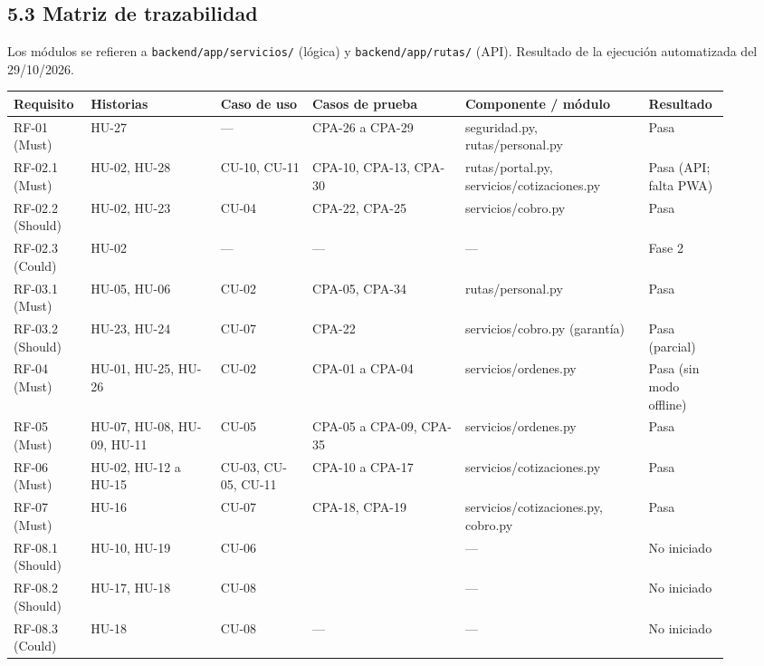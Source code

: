 \subsection{5.3 Matriz de trazabilidad}\label{matriz-de-trazabilidad}

Los módulos se refieren a \texttt{backend/app/servicios/} (lógica) y \texttt{backend/app/rutas/} (API).
Resultado de la ejecución automatizada del 29/10/2026.

{\footnotesize
\begin{longtable}{@{}L{0.09\linewidth}L{0.17\linewidth}L{0.12\linewidth}L{0.2\linewidth}L{0.24\linewidth}L{0.1\linewidth}@{}}
\toprule
\textbf{Requisito} & \textbf{Historias} & \textbf{Caso de uso} & \textbf{Casos de prueba} & \textbf{Componente / módulo} & \textbf{Resultado} \\
\midrule
\endhead
\bottomrule
\endlastfoot
RF-01 (Must) & HU-27 & --- & CPA-26 a CPA-29 & seguridad.py, rutas/personal.py & Pasa \\
RF-02.1 (Must) & HU-02, HU-28 & CU-10, CU-11 & CPA-10, CPA-13, CPA-30 & rutas/portal.py, servicios/cotizaciones.py & Pasa (API; falta PWA) \\
RF-02.2 (Should) & HU-02, HU-23 & CU-04 & CPA-22, CPA-25 & servicios/cobro.py & Pasa \\
RF-02.3 (Could) & HU-02 & --- & --- & --- & Fase 2 \\
RF-03.1 (Must) & HU-05, HU-06 & CU-02 & CPA-05, CPA-34 & rutas/personal.py & Pasa \\
RF-03.2 (Should) & HU-23, HU-24 & CU-07 & CPA-22 & servicios/cobro.py (garantía) & Pasa (parcial) \\
RF-04 (Must) & HU-01, HU-25, HU-26 & CU-02 & CPA-01 a CPA-04 & servicios/ordenes.py & Pasa (sin modo offline) \\
RF-05 (Must) & HU-07, HU-08, HU-09, HU-11 & CU-05 & CPA-05 a CPA-09, CPA-35 & servicios/ordenes.py & Pasa \\
RF-06 (Must) & HU-02, HU-12 a HU-15 & CU-03, CU-05, CU-11 & CPA-10 a CPA-17 & servicios/cotizaciones.py & Pasa \\
RF-07 (Must) & HU-16 & CU-07 & CPA-18, CPA-19 & servicios/cotizaciones.py, cobro.py & Pasa \\
RF-08.1 (Should) & HU-10, HU-19 & CU-06 & \pendiente{} & --- & No iniciado \\
RF-08.2 (Should) & HU-17, HU-18 & CU-08 & \pendiente{} & --- & No iniciado \\
RF-08.3 (Could) & HU-18 & CU-08 & --- & --- & No iniciado \\

\end{longtable}}
